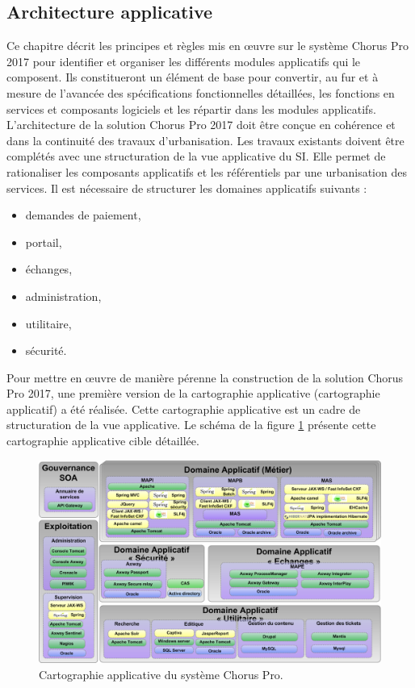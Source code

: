 \documentclass[12pt,a4paper]{article}
\begin{document}
\subsection{Architecture applicative}
Ce chapitre décrit les principes et règles mis en œuvre sur le système Chorus Pro 2017 pour identifier et organiser les différents modules applicatifs qui le composent. Ils constitueront un élément de base pour convertir, au fur et à mesure de l’avancée des spécifications fonctionnelles détaillées, les fonctions en services et composants logiciels et les répartir dans les modules applicatifs.
\newpage
L’architecture de la solution Chorus Pro 2017 doit être conçue en cohérence et dans la continuité des travaux d’urbanisation. Les travaux existants doivent être complétés avec une structuration de la vue applicative du SI. Elle permet de rationaliser les composants applicatifs et les référentiels par une urbanisation des services. Il est nécessaire de structurer les domaines applicatifs suivants :
\smallbreak
\begin{itemize}
\item	demandes de paiement,
\item	portail,
\item	échanges,
\item	administration,
\item	utilitaire,
\item	sécurité.
\end{itemize}
\bigbreak
Pour mettre en œuvre de manière pérenne la construction de la solution Chorus Pro 2017, une première version de la cartographie applicative (cartographie applicatif) a été réalisée. Cette cartographie applicative est un cadre de structuration de la vue applicative. Le schéma de la figure \ref{vueApplicative} présente cette cartographie applicative cible détaillée.\\
\begin{figure}[H]
	\begin{center}
		\includegraphics[width=\textwidth, height=\textheight, keepaspectratio]{cartographieApplicative.png}
		\caption{Cartographie applicative du système Chorus Pro.}
		\label{vueApplicative}
	\end{center}
\end{figure}
\end{document}
